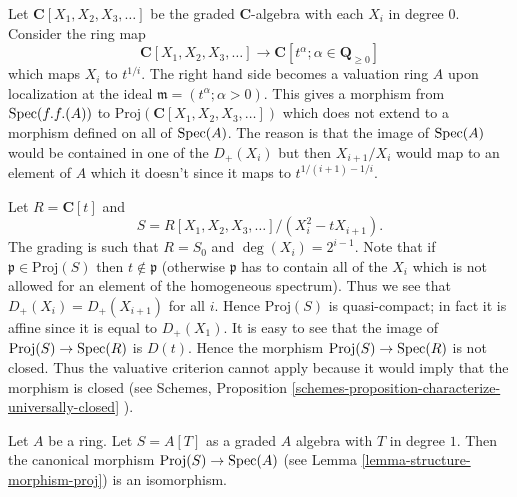 \begin{example}
\label{example-not-existence-valuative-big-proj}
Let $\mathbf{C}[X_1, X_2, X_3, \ldots]$ be the graded $\mathbf{C}$-algebra
with each $X_i$ in degree $0$. Consider the ring map
$$
\mathbf{C}[X_1, X_2, X_3, \ldots]
\longrightarrow
\mathbf{C}[t^\alpha ; \alpha \in \mathbf{Q}_{\geq 0}]
$$
which maps $X_i$ to $t^{1/i}$. The right hand side becomes a valuation ring
$A$ upon localization at the ideal $\mathfrak m = (t^\alpha ; \alpha > 0)$.
This gives a morphism from $\mathop{\rm Spec}(f.f.(A))$ to
$\text{Proj}(\mathbf{C}[X_1, X_2, X_3, \ldots])$ which does not
extend to a morphism defined on all of $\mathop{\rm Spec}(A)$.
The reason is that the image of $\mathop{\rm Spec}(A)$ would be contained
in one of the $D_{+}(X_i)$ but then $X_{i + 1}/X_i$ would map
to an element of $A$ which it doesn't since it maps to
$t^{1/(i + 1) - 1/i}$.
\end{example}

\begin{example}
\label{example-not-existence-valuative-small-proj}
Let $R = \mathbf{C}[t]$ and
$$
S = R[X_1, X_2, X_3, \ldots]/(X_i^2 - tX_{i + 1}).
$$
The grading is such that $R = S_0$ and $\deg(X_i) = 2^{i - 1}$.
Note that if $\mathfrak p \in \text{Proj}(S)$ then
$t \not \in \mathfrak p$ (otherwise $\mathfrak p$ has to contain
all of the $X_i$ which is not allowed for an element of
the homogeneous spectrum). Thus we see that
$D_{+}(X_i) = D_{+}(X_{i + 1})$ for all $i$. Hence
$\text{Proj}(S)$ is quasi-compact; in fact it is affine
since it is equal to $D_{+}(X_1)$. It is easy to see that
the image of $\text{Proj}(S) \to \mathop{\rm Spec}(R)$ is
$D(t)$. Hence the morphism $\text{Proj}(S) \to \mathop{\rm Spec}(R)$
is not closed. Thus the valuative criterion cannot apply because
it would imply that the morphism is closed (see
Schemes, Proposition \ref{schemes-proposition-characterize-universally-closed}
).
\end{example}

\begin{example}
\label{example-trivial-proj}
Let $A$ be a ring.
Let $S = A[T]$ as a graded $A$ algebra with $T$ in degree $1$.
Then the canonical morphism $\text{Proj}(S) \to \mathop{\rm Spec}(A)$
(see Lemma \ref{lemma-structure-morphism-proj})
is an isomorphism.
\end{example}
























